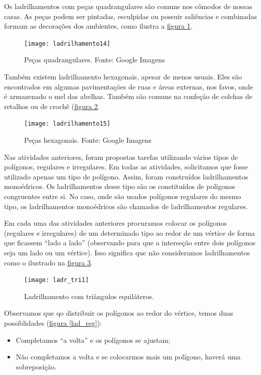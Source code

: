 

Os ladrilhamentos com peças quadrangulares são comuns nos cômodos de nossas casas. As peças podem ser pintadas, esculpidas ou possuir saliências e combinadas formam as decorações dos ambientes, como ilustra a \hyperref[lad_qd]{figura \ref{lad_qd}}.
 


\begin{figure}[H]
\centering
\texttt{[image: ladrilhamento14]}
\caption{Peças quadrangulares. Fonte: Google Imagens }
\label{lad_qd}
\end{figure}

Também existem ladrilhamento hexagonais, apesar de menos usuais. Eles são encontrados em algumas pavimentações de ruas e áreas externas, nos favos, onde é armazenado o mel das abelhas. Também são comuns na confeção de colchas de retalhos  ou  de crochê (\hyperref[lad_hex]{figura \ref{lad_hex}}.

\begin{figure}[H]
\centering
\texttt{[image: ladrilhamento15]}
\caption{Peças hexagonais. Fonte: Google Imagens }
\label{lad_hex}
\end{figure}

Nas atividades anteriores, foram propostas tarefas utilizando vários tipos de polígonos, regulares e irregulares. Em todas as atividades, solicitamos que fosse utilizado apenas um tipo de polígono. Assim, foram construídos ladrilhamentos monoédricos. Os ladrilhamentos desse tipo são os constituídos de polígonos congruentes entre si. No caso, onde são usados polígonos regulares do mesmo tipo, os ladrilhamentos monoédricos são chamados de ladrilhamentos regulares.

Em cada uma das atividades anteriores procuramos colocar os polígonos (regulares e irregulares) de um determinado tipo ao redor de um vértice de forma que ficassem “lado a lado” (observando para que a interseção entre dois polígonos seja um lado ou um vértice). Isso significa que não consideramos ladrilhamentos como o ilustrado na \hyperref[ladr_tri1]{figura \ref{ladr_tri1}}. 

\begin{figure}[H]
\centering
\texttt{[image: ladr\_tri1]}
\caption{Ladrilhamento com triângulos equiláteros.}
\label{ladr_tri1}
\end{figure}


Observamos que qo distribuir os polígonos ao redor do vértice,  temos duas possiblidades (\hyperref[lad_reg]{figura \ref{lad_reg}}): 
\begin{itemize}
\item	Completamos “a volta” e os polígonos se ajustam;
\item 	Não completamos a volta e se colocarmos mais um polígono, haverá uma sobreposição.
\end{itemize}


